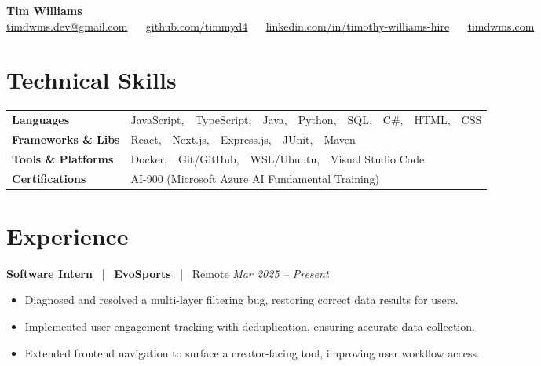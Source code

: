 \documentclass[10pt, letterpaper]{article}
\newcommand{\jobhead}[4]{%
  \vspace{5pt}%
  {\bfseries\color{dark}#1}%
  ~{\color{light}|}~%
  {\bfseries\color{navy}#2}%
  ~{\color{light}|}~%
  {\color{light}#3}%
  \hfill{\color{light}\small\textit{#4}}\\[-2pt]%
}
\newcommand{\skillrow}[2]{%
  {\bfseries #1} & #2 \\[2pt]%
}
\begin{document}

\begin{center}
  {\huge\bfseries\color{navy} Tim Williams}\\[4pt]
  {\small\color{light}
    \href{mailto:timdwms.dev@gmail.com}{timdwms.dev@gmail.com}
    ~\textbullet~
    \href{https://github.com/timmyd4}{github.com/timmyd4}
    ~\textbullet~
    \href{https://www.linkedin.com/in/timothy-williams-hire}{linkedin.com/in/timothy-williams-hire}
    ~\textbullet~
    \href{https://timdwms.com}{timdwms.com}
  }
\end{center}

\vspace{2pt}

\section{Technical Skills}

\begin{tabular}{@{}p{1.6in} p{5.2in}@{}}
  \skillrow{Languages}{JavaScript,\ \ TypeScript,\ \ Java,\ \ Python,\ \ SQL,\ \ C\#,\ \ HTML,\ \ CSS}
  \skillrow{Frameworks \& Libs}{React,\ \ Next.js,\ \ Express.js,\ \ JUnit,\ \ Maven}
  \skillrow{Tools \& Platforms}{Docker,\ \ Git/GitHub,\ \ WSL/Ubuntu,\ \ Visual Studio Code}
  \skillrow{Certifications}{AI-900 (Microsoft Azure AI Fundamental Training)}
\end{tabular}

\section{Experience}

\jobhead{Software Intern}{EvoSports}{Remote}{Mar 2025 – Present}
\begin{itemize}
  \item Diagnosed and resolved a multi-layer filtering bug, restoring correct data results for users.
  \item Implemented user engagement tracking with deduplication, ensuring accurate data collection.
  \item Extended frontend navigation to surface a creator-facing tool, improving user workflow access.
\end{itemize}
\end{document}
